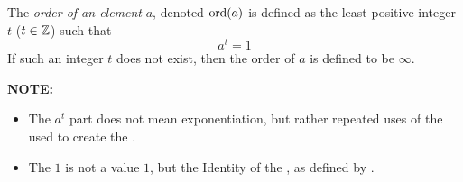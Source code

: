 \begin{definition}\label{def:Element_in_Group_Order}
  The \emph{order of an element} $a$, denoted $\operatorname{\text{ord}}(a)$ is defined as the least positive integer $t$ ($t \in \operatorname{\mathbb{Z}}$) such that
  \begin{equation}\label{eq:Element_in_Group_Order}
    a^{t} = 1
  \end{equation}
  If such an integer $t$ does not exist, then the order of $a$ is defined to be $\infty$.

  \begin{remark}\label{rmk:Element_in_Group_Order_Term_Explanation}
    \textbf{NOTE:}
    \begin{itemize}[noitemsep]
    \item The $a^{t}$ part does not mean exponentiation, but rather repeated uses of the  used to create the .
    \item The $1$ is not a value $1$, but the Identity of the , as defined by .
    \end{itemize}
  \end{remark}
\end{definition}


